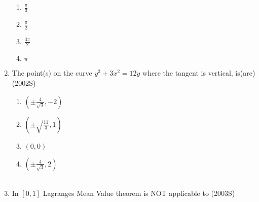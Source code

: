\documentclass[journal]{IEEEtran}
\begin{document}
\begin{enumerate}[start=9]
\begin{multicols}{2}
\begin{enumerate}
    \item $\displaystyle\frac{\pi}{3}$\\
    \item $\displaystyle\frac{\pi}{2}$\\
    \item $\displaystyle\frac{3\pi}{2}$\\
    \item $\pi$
\end{enumerate}
\end{multicols}
\item The point(s) on the curve $y^3+3x^2=12y$ where the tangent is vertical, is(are)
\hfill {(2002S)}\\
\begin{multicols}{2}
\begin{enumerate}
    \item $\left(\pm \displaystyle\frac{4}{\sqrt{3}},-2\right)$\\
    \item $\left(\pm\sqrt{\displaystyle\frac{11}{3}},1\right)$\\
    \item $(0,0)$\\
    \item $\left(\pm \displaystyle\frac{4}{\sqrt{3}},2\right)$\\\\
\end{enumerate}
\end{multicols}
\item In $[0,1]$ Lagranges Mean Value theorem is NOT applicable to
\hfill {(2003S)}


\end{enumerate}
\end{document}
